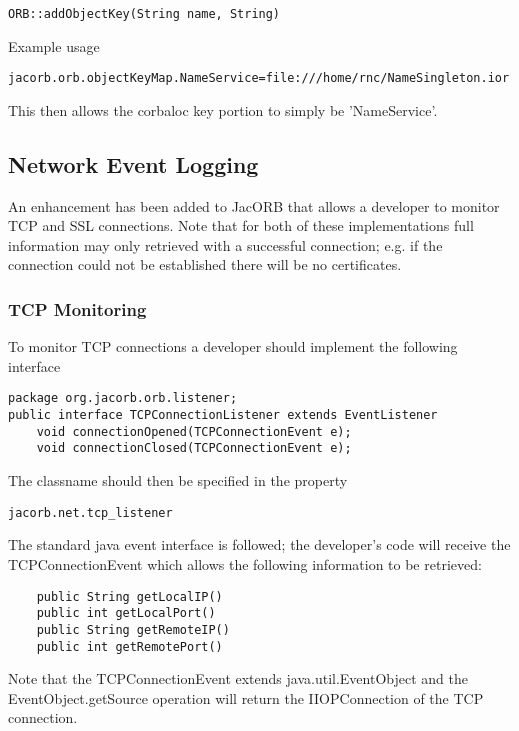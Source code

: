 {\tt ORB::addObjectKey(String name, String)}

Example usage

{\tt jacorb.orb.objectKeyMap.NameService=file:///home/rnc/NameSingleton.ior}

This then allows the corbaloc key portion to simply be 'NameService'.

\subsection{Network Event Logging}
\label{eventLogging}

An enhancement has been added to JacORB that allows a developer to monitor TCP and SSL connections.
Note that for both of these implementations full information may only retrieved with a successful connection;
e.g. if the connection could not be established there will be no certificates.

\subsubsection{TCP Monitoring}

To monitor TCP connections a developer should implement the following interface
\begin{small}
\begin{verbatim}
package org.jacorb.orb.listener;
public interface TCPConnectionListener extends EventListener
    void connectionOpened(TCPConnectionEvent e);
    void connectionClosed(TCPConnectionEvent e);
\end{verbatim}
\end{small}
The classname should then be specified in the property
\begin{verbatim}
jacorb.net.tcp_listener
\end{verbatim}

The standard java event interface is followed; the developer's code will receive the
TCPConnectionEvent which allows the following information to be retrieved:
\begin{small}
\begin{verbatim}
    public String getLocalIP()
    public int getLocalPort()
    public String getRemoteIP()
    public int getRemotePort()
\end{verbatim}
\end{small}
Note that the TCPConnectionEvent extends java.util.EventObject and the EventObject.getSource
operation will return the IIOPConnection of the TCP connection.

